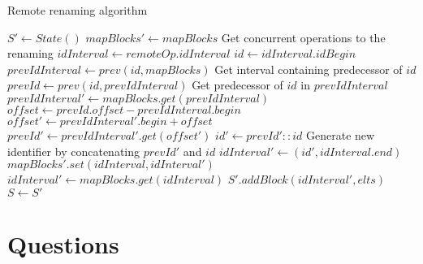 \documentclass[a4paper]{article}
\begin{document}
\begin{algorithm}
  \caption{Remote renaming algorithm}
  \label{alg:rename-remote-blocks}
  \begin{algorithmic}
    \State $S' \gets State()$
    \State $mapBlocks' \gets mapBlocks$
    \Comment Get concurrent operations to the renaming
      \State $idInterval \gets remoteOp.idInterval$
        \State $id \gets idInterval.idBegin$
        \State $prevIdInterval \gets prev(id, mapBlocks)$
        \Comment Get interval containing predecessor of $id$
        \State $prevId \gets prev(id, prevIdInterval)$
        \Comment Get predecessor of $id$ in $prevIdInterval$
        \State $prevIdInterval' \gets mapBlocks.get(prevIdInterval)$
        \State $offset \gets prevId.offset - prevIdInterval.begin$
        \State $offset' \gets prevIdInterval'.begin + offset$
        \State $prevId' \gets prevIdInterval'.get(offset')$
        \State $id' \gets prevId' :: id$
        \Comment Generate new identifier by concatenating $prevId'$ and $id$
        \State $idInterval' \gets (id', idInterval.end)$
        \State $mapBlocks'.set(idInterval, idInterval')$
      \EndIf
    \EndFor
      \State $idInterval' \gets mapBlocks.get(idInterval)$
      \State $S'.addBlock(idInterval', elts)$
    \EndFor
    \State $S \gets S'$
    \EndProcedure
  \end{algorithmic}
\end{algorithm}

\section{Questions}
\end{document}
